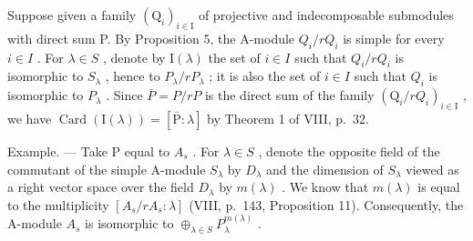 Suppose given a family \((\mathrm{Q}_{i})_{i\in\mathrm{I}}\) of projective and indecomposable submodules with direct sum P. By Proposition 5, the A-module \(Q_{i}/rQ_{i}\) is simple for every \(i\in I\) . For \(\lambda\in S\) , denote by \(\mathrm{I}(\lambda)\) the set of \(i\in I\) such that \(Q_{i}/rQ_{i}\) is isomorphic to \(S_{\lambda}\) , hence to \(P_{\lambda}/rP_{\lambda}\) ; it is also the set of \(i\in I\) such that \(Q_{i}\) is isomorphic to \(P_{\lambda}\) . Since \(\overline{P}=P/rP\) is the direct sum of the family \((\mathrm{Q}_{i}/rQ_{i})_{i\in\mathrm{I}}\) , we have \(\operatorname{Card}(\mathrm{I}(\lambda))=[\overline{\mathrm{P}}:\lambda]\) by Theorem 1 of VIII, p.~32.

Example. --- Take P equal to \(A_{s}\) . For \(\lambda \in S\) , denote the opposite field of the commutant of the simple A-module \(S_{\lambda}\) by \(D_{\lambda}\) and the dimension of \(S_{\lambda}\) viewed as a right vector space over the field \(D_{\lambda}\) by \(m(\lambda)\) . We know that \(m(\lambda)\) is equal to the multiplicity \([A_{s}/rA_{s} : \lambda]\) (VIII, p.~143, Proposition 11). Consequently, the A-module \(A_{s}\) is isomorphic to \(\oplus_{\lambda \in S} P_{\lambda}^{m(\lambda)}\) .

